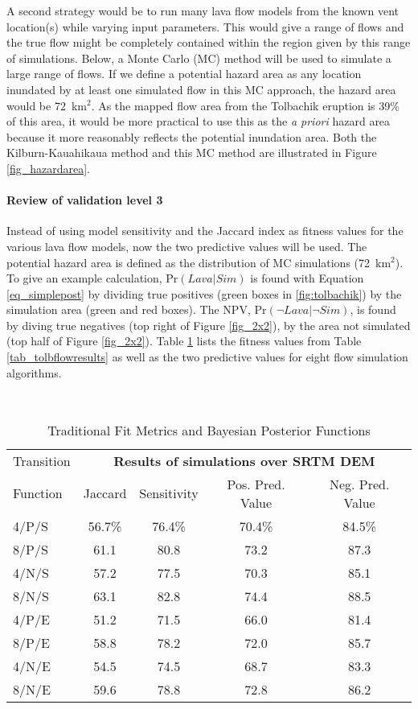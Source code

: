 	A second strategy would be to run many lava flow models from the known vent location(s) while varying input parameters. This would give a range of flows and the true flow might be completely contained within the region given by this range of simulations. Below, a Monte Carlo (MC) method will be used to simulate a large range of flows. If we define a potential hazard area as any location inundated by at least one simulated flow in this MC approach, the hazard area would be 72~km$^2$. As the mapped flow area from the Tolbachik eruption is 39\% of this area, it would be more practical to use this as the \textit{a priori} hazard area because it more reasonably reflects the potential inundation area. Both the Kilburn-Kauahikaua method and this MC method are illustrated in Figure \ref{fig_hazardarea}.				
	
	\paragraph{Review of validation level 3} Instead of using model sensitivity and the Jaccard index as fitness values for the various lava flow models, now the two predictive values will be used. The potential hazard area is defined as the distribution of MC simulations (72~km$^2$). To give an example calculation, $\text{Pr}(Lava|Sim)$ is found with Equation \ref{eq_simplepost} by dividing true positives (green boxes in \ref{fig:tolbachik}) by the simulation area (green and red boxes). The NPV, $\text{Pr}(\neg Lava|\neg Sim)$, is found by diving true negatives (top right of Figure \ref{fig_2x2}), by the area not simulated (top half of Figure \ref{fig_2x2}). Table \ref{tab_fitmetriccompare} lists the fitness values from Table \ref{tab_tolbflowresults} as well as the two predictive values for eight flow simulation algorithms.
	
		\begin{table}[h]
		\centering
		\caption{Traditional Fit Metrics and Bayesian Posterior Functions}\\
		\begin{tabular}{l c c c c}
			\toprule
			Transition&\multicolumn{4}{c}{\textbf{Results of simulations over SRTM DEM}}\\
			Function& Jaccard & Sensitivity & Pos. Pred. Value & Neg. Pred. Value\\
			\midrule
			4/P/S & 56.7\%& 76.4\%& 70.4\%& 84.5\% \\
			8/P/S & 61.1  & 80.8  & 73.2  & 87.3   \\
			4/N/S & 57.2  & 77.5  & 70.3  & 85.1   \\
			8/N/S & 63.1  & 82.8  & 74.4  & 88.5   \\
			4/P/E & 51.2  & 71.5  & 66.0  & 81.4   \\
			8/P/E & 58.8  & 78.2  & 72.0  & 85.7   \\
			4/N/E & 54.5  & 74.5  & 68.7  & 83.3   \\
			8/N/E & 59.6  & 78.8  & 72.8  & 86.2   \\
			
			\bottomrule
		\end{tabular}
		\label{tab_fitmetriccompare}
	\end{table}
	
